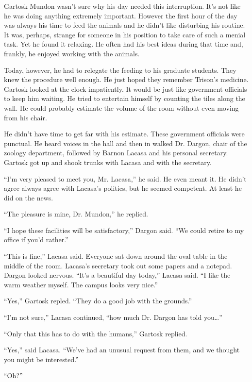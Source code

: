 Gartosk Mundon wasn't sure why his day needed this interruption. It's not like he was
doing anything extremely important. However the first hour of the day was always his time to
feed the animals and he didn't like disturbing his routine. It was, perhaps, strange for
someone in his position to take care of such a menial task. Yet he found it relaxing. He often
had his best ideas during that time and, frankly, he enjoyed working with the animals.

Today, however, he had to relegate the feeding to his graduate students. They knew the procedure
well enough. He just hoped they remember Trison's medicine. Gartosk looked at the clock
impatiently. It would be just like government officials to keep him waiting. He tried to
entertain himself by counting the tiles along the wall. He could probably estimate the volume of
the room without even moving from his chair.

He didn't have time to get far with his estimate. These government officials were punctual.
He heard voices in the hall and then in walked Dr. Dargon, chair of the zoology department,
followed by Barnon Lacasa and his personal secretary. Gartosk got up and shook trunks with
Lacasa and with the secretary.

``I'm very pleased to meet you, Mr. Lacasa,'' he said. He even meant it. He didn't
agree always agree with Lacasa's politics, but he seemed competent. At least he did on the
news.

``The pleasure is mine, Dr. Mundon,'' he replied.

``I hope these facilities will be satisfactory,'' Dargon said. ``We could retire to my
office if you'd rather.''

``This is fine,'' Lacasa said. Everyone sat down around the oval table in the middle of the
room. Lacasa's secretary took out some papers and a notepad. Dargon looked nervous. ``It's a
beautiful day today,'' Lacasa said. ``I like the warm weather myself. The campus looks very
nice.''

``Yes,'' Gartosk repled. ``They do a good job with the grounds.''

``I'm not sure,'' Lacasa continued, ``how much Dr. Dargon has told you\ldots''

``Only that this has to do with the humans,'' Gartosk replied.

``Yes,'' said Lacasa. ``We've had an unusual request from them, and we thought you
might be interested.''

``Oh?''

